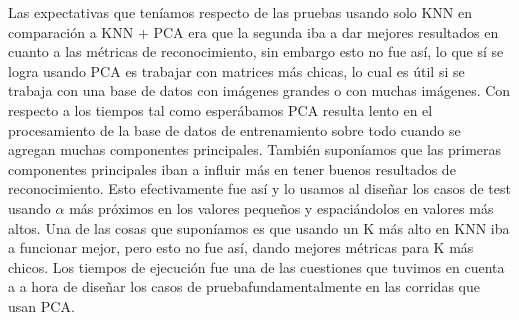 Las expectativas que teníamos respecto de las pruebas usando solo KNN en comparación a KNN + PCA era que la segunda iba a dar mejores resultados en cuanto a las métricas de reconocimiento, sin embargo esto no fue así, lo que sí se logra usando PCA es trabajar con matrices más chicas, lo cual es útil si se trabaja con una base de datos con imágenes grandes o con muchas imágenes.
Con respecto a los tiempos tal como esperábamos PCA resulta lento en el procesamiento de la base de datos de entrenamiento sobre todo cuando se agregan muchas componentes principales. También suponíamos que las primeras componentes principales iban a influir más en tener buenos resultados de reconocimiento. Esto efectivamente fue así y lo usamos al diseñar los casos de test usando $\alpha$ más próximos en los valores pequeños y espaciándolos en valores más altos.
Una de las cosas que suponíamos es que usando un K más alto en KNN iba a funcionar mejor, pero esto no fue así, dando mejores métricas para K más chicos.
Los tiempos de ejecución fue una de las cuestiones que tuvimos en cuenta a a hora de diseñar los casos de pruebafundamentalmente en las corridas que usan PCA.